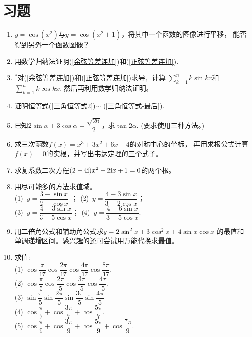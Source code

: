 \section{习题}
\begin{enumerate}[label={\textbf{\arabic*.}},leftmargin=
    \inteval{\myenumleftmargin}pt]
\item $ y=\cos(x^2) $与$ y=\cos(x^2+1) $，将其中一个函数的图像进行平移，
能否得到另外一个函数图像？

\item 用数学归纳法证明(\ref{余弦等差连加})和(\ref{正弦等差连加}).   

\item $ ^* $对(\ref{余弦等差连加})和(\ref{正弦等差连加})求导，计算
$ \sum\limits_{k=1}^{n}k\sin kx $和$ \sum\limits_{k=1}^{n}k\cos kx $. 
然后再利用数学归纳法证明。

\item 证明恒等式(\ref{三角恒等式2})$ \sim $ (\ref{三角恒等式-最后}).

\item 已知$ 2\sin\alpha+3\cos\alpha=\dfrac{\sqrt{26}}{2} $，求$ \tan2\alpha $.
(要求使用三种方法。)

\item 求三次函数$ f(x)=x^3+3x^2+6x-4 $的对称中心的坐标，
再用求根公式计算$ f(x)=0 $的实根，并写出韦达定理的三个式子。

\item 求复系数二次方程$ (2-4\mathrm{i})x^2+2\mathrm{i} x+1=0 $的两个根。

\item 用尽可能多的方法求值域。\\
(1)\ $ y=\dfrac{3-\sin x}{2-\cos x} $ ；\quad 
(2)\ $ y=\dfrac{4-3\sin x}{3-2\cos x} $；\\
(3)\ $ y=\dfrac{4-3\sin x}{3-5\cos x} $；\quad
(4)\ $ y=\dfrac{4-6\sin x}{3-5\cos x} $.

\item 用二倍角公式和辅助角公式求$ y=2\sin^2 x+3\cos^2 x+4\sin x\cos x $
的最值和单调递增区间。感兴趣的还可尝试用万能代换求最值。

\item 求值: \\
(1) $ \cos\dfrac{\pi}{17}\cos\dfrac{2\pi}{17}\cos\dfrac{4\pi}{17}
\cos\dfrac{8\pi}{17} $. \\
(2) $ \cos\dfrac{\pi}{5}\cos\dfrac{2\pi}{5}\cos\dfrac{3\pi}{5}
\cos\dfrac{4\pi}{5} $. \\
(3) $ \sin\dfrac{\pi}{5}\sin\dfrac{2\pi}{5}\sin\dfrac{3\pi}{5}
\sin\dfrac{4\pi}{5} $. \\
(4) $ \cos\dfrac{\pi}{7}+\cos\dfrac{3\pi}{7}+\cos\dfrac{5\pi}{7} $. \\
(5) $ \cos\dfrac{\pi}{9}+\cos\dfrac{3\pi}{9}+\cos\dfrac{5\pi}{9}+\cos\dfrac{7\pi}{9} $. 


\end{enumerate}
